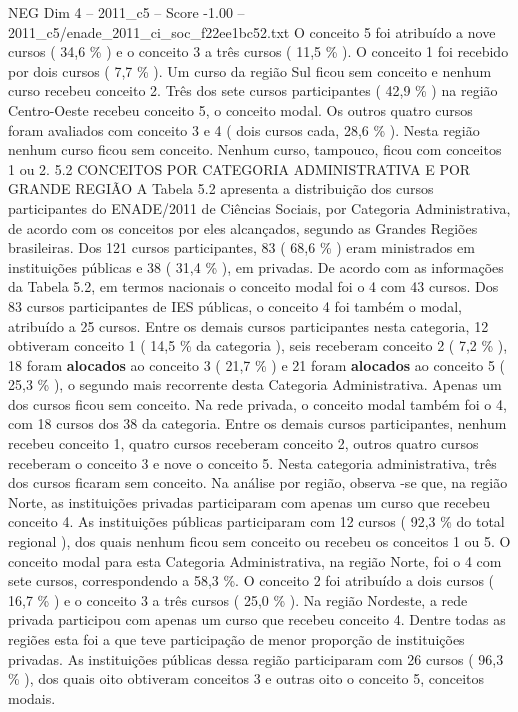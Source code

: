 \begin{textsample}{NEG Dim 4 – 2011\_c5 – Score -1.00 – 2011\_c5/enade\_2011\_ci\_soc\_f22ee1bc52.txt}
O conceito 5 foi atribuído a nove cursos ( 34,6 \% ) e o conceito 3 a três cursos ( 11,5 \% ).
O conceito 1 foi recebido por dois cursos ( 7,7 \% ).
Um curso da região Sul ficou sem conceito e nenhum curso recebeu conceito 2.
Três dos sete cursos participantes ( 42,9 \% ) na região Centro-Oeste recebeu conceito 5, o conceito modal.
Os outros quatro cursos foram avaliados com conceito 3 e 4 ( dois cursos cada, 28,6 \% ).
Nesta região nenhum curso ficou sem conceito.
Nenhum curso, tampouco, ficou com conceitos 1 ou 2. 5.2 CONCEITOS POR CATEGORIA ADMINISTRATIVA E POR GRANDE REGIÃO A Tabela 5.2 apresenta a distribuição dos cursos participantes do ENADE/2011 de Ciências Sociais, por Categoria Administrativa, de acordo com os conceitos por eles alcançados, segundo as Grandes Regiões brasileiras.
Dos 121 cursos participantes, 83 ( 68,6 \% ) eram ministrados em instituições públicas e 38 ( 31,4 \% ), em privadas.
De acordo com as informações da Tabela 5.2, em termos nacionais o conceito modal foi o 4 com 43 cursos.
Dos 83 cursos participantes de IES públicas, o conceito 4 foi também o modal, atribuído a 25 cursos.
Entre os demais cursos participantes nesta categoria, 12 obtiveram conceito 1 ( 14,5 \% da categoria ), seis receberam conceito 2 ( 7,2 \% ), 18 foram \textbf{alocados} ao conceito 3 ( 21,7 \% ) e 21 foram \textbf{alocados} ao conceito 5 ( 25,3 \% ), o segundo mais recorrente desta Categoria Administrativa.
Apenas um dos cursos ficou sem conceito.
Na rede privada, o conceito modal também foi o 4, com 18 cursos dos 38 da categoria.
Entre os demais cursos participantes, nenhum recebeu conceito 1, quatro cursos receberam conceito 2, outros quatro cursos receberam o conceito 3 e nove o conceito 5.
Nesta categoria administrativa, três dos cursos ficaram sem conceito.
Na análise por região, observa -se que, na região Norte, as instituições privadas participaram com apenas um curso que recebeu conceito 4.
As instituições públicas participaram com 12 cursos ( 92,3 \% do total regional ), dos quais nenhum ficou sem conceito ou recebeu os conceitos 1 ou 5.
O conceito modal para esta Categoria Administrativa, na região Norte, foi o 4 com sete cursos, correspondendo a 58,3 \%.
O conceito 2 foi atribuído a dois cursos ( 16,7 \% ) e o conceito 3 a três cursos ( 25,0 \% ).
Na região Nordeste, a rede privada participou com apenas um curso que recebeu conceito 4.
Dentre todas as regiões esta foi a que teve participação de menor proporção de instituições privadas.
As instituições públicas dessa região participaram com 26 cursos ( 96,3 \% ), dos quais oito obtiveram conceitos 3 e outras oito o conceito 5, conceitos modais.

\end{textsample}
